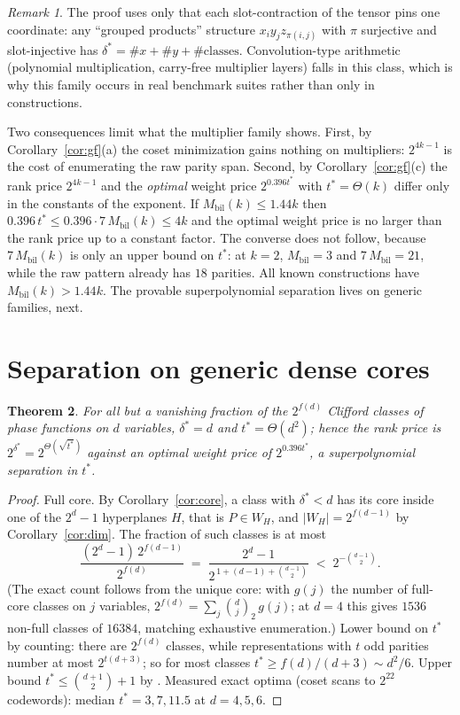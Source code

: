 \documentclass[11pt]{article}
\newtheorem{theorem}{Theorem}
\theoremstyle{definition}
\theoremstyle{remark}
\newtheorem{remark}[theorem]{Remark}
\newcommand{\ds}{\delta^{*}}
\newcommand{\ts}{t^{*}}
\newcommand{\Mbil}{M_{\mathrm{bil}}}
\begin{document}
\begin{remark}\label{rem:general}
The proof uses only that each slot-contraction of the tensor pins one coordinate:
any ``grouped products'' structure $x_iy_jz_{\pi(i,j)}$ with $\pi$ surjective and slot-injective has $\ds=\#x+
\#y+\#\text{classes}$. Convolution-type arithmetic (polynomial multiplication, carry-free multiplier
layers) falls in this class, which is why this family occurs in real benchmark suites rather than
only in constructions.
\end{remark}

Two consequences limit what the multiplier family shows. First, by Corollary~\ref{cor:gf}(a) the coset
minimization gains nothing on multipliers: $2^{4k-1}$ is the cost of enumerating the raw parity span.
Second, by Corollary~\ref{cor:gf}(c) the rank price $2^{4k-1}$ and the
\emph{optimal} weight price $2^{0.396\ts}$ with $\ts=\Theta(k)$ differ only in the constants of the exponent.
If $\Mbil(k)\le1.44k$ then $0.396\,\ts\le0.396\cdot7\,\Mbil(k)\le4k$ and the optimal weight price is no larger
than the rank price up to a constant factor. The converse does not follow, because $7\,\Mbil(k)$ is only an upper bound on $\ts$:
at $k=2$, $\Mbil=3$ and $7\,\Mbil=21$, while the raw pattern already has $18$ parities.
All known constructions have $\Mbil(k)>1.44k$. The provable
superpolynomial separation lives on generic families, next.

\section{Separation on generic dense cores}\label{sec:sep}

\begin{theorem}\label{thm:sep}
For all but a vanishing fraction of the $2^{f(d)}$ Clifford classes of phase functions on $d$ variables,
$\ds=d$ and $\ts=\Theta(d^2)$; hence the rank price is $2^{\ds}=2^{\Theta(\sqrt{\ts})}$ against
an optimal weight price of $2^{0.396\ts}$, a superpolynomial separation in $\ts$.
\end{theorem}
\begin{proof}
Full core. By Corollary~\ref{cor:core}, a class with $\ds<d$ has its core inside one of the $2^d-1$ hyperplanes $H$,
that is $P\in W_H$, and $|W_H|=2^{f(d-1)}$ by Corollary~\ref{cor:dim}. The fraction of such classes is at most
\[
  \frac{(2^d-1)\,2^{f(d-1)}}{2^{f(d)}}\;=\;\frac{2^d-1}{2^{\,1+(d-1)+\binom{d-1}2}}\;<\;2^{-\binom{d-1}2}.
\]
(The exact count follows from the unique core: with $g(j)$ the number of full-core classes on $j$ variables,
$2^{f(d)}=\sum_j\binom dj_{\!2}\,g(j)$; at $d=4$ this gives $1536$ non-full classes of $16384$, matching exhaustive enumeration.)
Lower bound on $\ts$ by counting: there are $2^{f(d)}$ classes, while
representations with $t$ odd parities number at most $2^{t(d+3)}$; so for most classes $\ts\ge
f(d)/(d+3)\sim d^2/6$. Upper bound $\ts\le\binom{d+1}2+1$ by \cite[Thm.~3]{Van24}.
Measured exact optima (coset scans
to $2^{22}$ codewords): median $\ts=3,7,11.5$ at $d=4,5,6$.
\end{proof}
\end{document}
